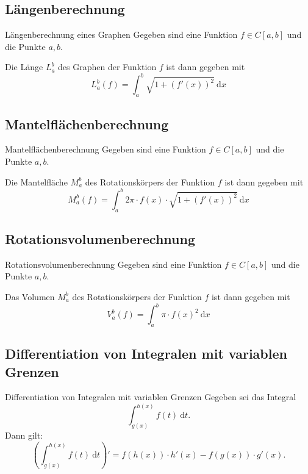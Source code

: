 \documentclass[german]{../spicker}
\newcommand{\dx}{~\mathrm{d}x}
\newcommand{\dt}{~\mathrm{d}t}
\begin{document}
\newpage
\subsection{Längenberechnung}

\begin{algo}{Längenberechnung eines Graphen}
    Gegeben sind eine Funktion $f\in C[a, b]$ und die Punkte $a, b$.

    Die Länge $L_a^b$ des Graphen der Funktion $f$ ist dann gegeben mit
    $$
        L^b_a(f) = \int_a^b \sqrt{1+(f'(x))^2} \dx
    $$
\end{algo}

\subsection{Mantelflächenberechnung}

\begin{algo}{Mantelflächenberechnung}
    Gegeben sind eine Funktion $f\in C[a, b]$ und die Punkte $a, b$.

    Die Mantelfläche $M_a^b$ des Rotationskörpers der Funktion $f$ ist dann gegeben mit
    $$
        M^b_a(f) = \int_a^b 2\pi \cdot f(x) \cdot \sqrt{1+(f'(x))^2} \dx
    $$
\end{algo}

\subsection{Rotationsvolumenberechnung}

\begin{algo}{Rotationsvolumenberechnung}
    Gegeben sind eine Funktion $f\in C[a, b]$ und die Punkte $a, b$.

    Das Volumen $M_a^b$ des Rotationskörpers der Funktion $f$ ist dann gegeben mit
    $$
        V^b_a(f) = \int_a^b \pi \cdot f(x)^2 \dx
    $$
\end{algo}

\subsection{Differentiation von Integralen mit variablen Grenzen}

\begin{algo}{Differentiation von Integralen mit variablen Grenzen}
    Gegeben sei das Integral
    $$
        \int^{h(x)}_{g(x)} f(t)\dt.
    $$
    Dann gilt:
    $$
        \left(\int^{h(x)}_{g(x)} f(t)\dt\right)' = f(h(x)) \cdot h'(x) - f(g(x))\cdot g'(x).
    $$
\end{algo}
\end{document}
